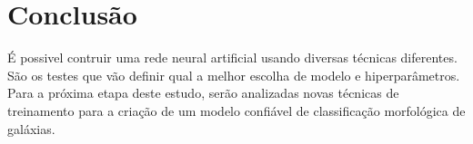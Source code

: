 \section{Conclusão}

É possivel contruir uma rede neural artificial usando diversas técnicas diferentes. São os testes que vão definir qual a melhor escolha de modelo e hiperparâmetros. Para a próxima etapa deste estudo, serão analizadas novas técnicas de treinamento para a criação de um modelo confiável de classificação morfológica de galáxias.